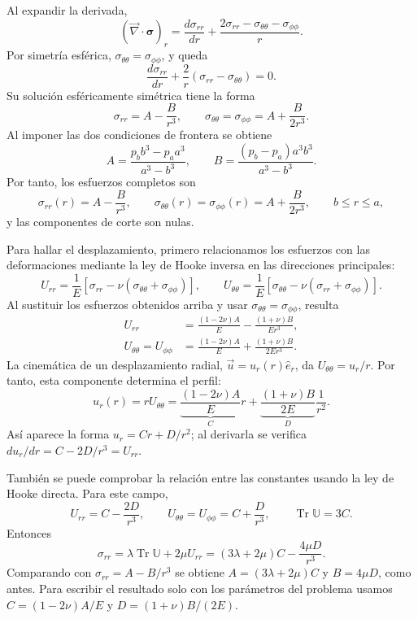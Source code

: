 \documentclass[a4paper]{article}
\begin{document}
Al expandir la derivada,
\[
(\vec\nabla\cdot\boldsymbol{\sigma})_r
=\frac{d\sigma_{rr}}{dr}
+\frac{2\sigma_{rr}-\sigma_{\theta\theta}-\sigma_{\phi\phi}}{r}.
\]
Por simetría esférica, $\sigma_{\theta\theta}=\sigma_{\phi\phi}$, y queda
\[
\frac{d\sigma_{rr}}{dr}+\frac{2}{r}(\sigma_{rr}-\sigma_{\theta\theta})=0.
\]
Su solución esféricamente simétrica tiene la forma
\[
\sigma_{rr}=A-\frac{B}{r^3},
\qquad
\sigma_{\theta\theta}=\sigma_{\phi\phi}=A+\frac{B}{2r^3}.
\]
Al imponer las dos condiciones de frontera se obtiene
\[
\boxed{A=\frac{p_b b^3-p_a a^3}{a^3-b^3}},
\qquad
\boxed{B=\frac{(p_b-p_a)a^3b^3}{a^3-b^3}}.
\]
Por tanto, los esfuerzos completos son
\[
\boxed{\sigma_{rr}(r)=A-\frac{B}{r^3}},
\qquad
\boxed{\sigma_{\theta\theta}(r)=\sigma_{\phi\phi}(r)=A+\frac{B}{2r^3}},
\qquad b\le r\le a,
\]
y las componentes de corte son nulas.

Para hallar el desplazamiento, primero relacionamos los esfuerzos con las deformaciones mediante la ley de Hooke inversa en las direcciones principales:
\[
U_{rr}=\frac{1}{E}\left[\sigma_{rr}
-\nu(\sigma_{\theta\theta}+\sigma_{\phi\phi})\right],
\qquad
U_{\theta\theta}=\frac{1}{E}\left[\sigma_{\theta\theta}
-\nu(\sigma_{rr}+\sigma_{\phi\phi})\right].
\]
Al sustituir los esfuerzos obtenidos arriba y usar
$\sigma_{\theta\theta}=\sigma_{\phi\phi}$, resulta
\[
\begin{aligned}
U_{rr}
&=\frac{(1-2\nu)A}{E}-\frac{(1+\nu)B}{Er^3},\\
U_{\theta\theta}=U_{\phi\phi}
&=\frac{(1-2\nu)A}{E}
+\frac{(1+\nu)B}{2Er^3}.
\end{aligned}
\]
La cinemática de un desplazamiento radial, $\vec u=u_r(r)\hat e_r$, da
$U_{\theta\theta}=u_r/r$. Por tanto, esta componente determina el perfil:
\[
u_r(r)=rU_{\theta\theta}
=\underbrace{\frac{(1-2\nu)A}{E}}_{C}r
+\underbrace{\frac{(1+\nu)B}{2E}}_{D}\frac{1}{r^2}.
\]
Así aparece la forma $u_r=Cr+D/r^2$; al derivarla se verifica
$du_r/dr=C-2D/r^3=U_{rr}$.

También se puede comprobar la relación entre las constantes usando la ley de Hooke directa. Para este campo,
\[
U_{rr}=C-\frac{2D}{r^3},
\qquad
U_{\theta\theta}=U_{\phi\phi}=C+\frac{D}{r^3},
\qquad \operatorname{Tr}\mathbb U=3C.
\]
Entonces
\[
\sigma_{rr}=\lambda\operatorname{Tr}\mathbb U+2\mu U_{rr}
=(3\lambda+2\mu)C-\frac{4\mu D}{r^3}.
\]
Comparando con $\sigma_{rr}=A-B/r^3$ se obtiene
$A=(3\lambda+2\mu)C$ y $B=4\mu D$, como antes. Para escribir el resultado solo con los parámetros del problema usamos
$C=(1-2\nu)A/E$ y $D=(1+\nu)B/(2E)$.
\end{document}

